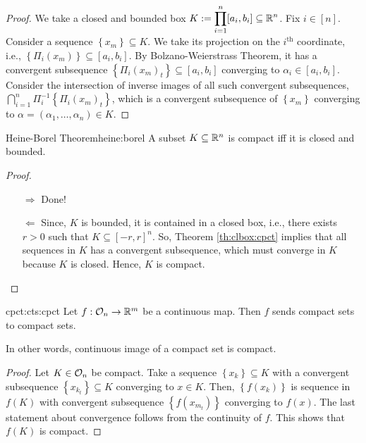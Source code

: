 \documentclass[../Analysis-3.tex]{subfiles}
\begin{document}
\begin{proof}
  We take a closed and bounded box $ \displaystyle K := \prod_{i=1}^{n} [a_i, b_i] \subseteq \mathbb{R}^n $. Fix $ i \in [n] $. Consider a sequence $ \left\{ x_m \right\} \subseteq K $. We take its projection on the $ i^{\text{th}} $ coordinate, i.e., $ \left\{ \Pi_i(x_m) \right\} \subseteq [a_i, b_i] $. By Bolzano-Weierstrass Theorem, it has a convergent subsequence $ \left\{ \Pi_i(x_m)_t \right\} \subseteq [a_i, b_i] $ converging to $ \alpha_i \in [a_i, b_i] $. Consider the intersection of inverse images of all such convergent subsequences, $ \displaystyle \bigcap_{i=1}^n \Pi_i^{-1}\left\{ \Pi_i(x_m)_t \right\} $, which is a convergent subsequence of $ \left\{ x_m \right\} $ converging to $ \alpha = (\alpha_1, \ldots, \alpha_n) \in K $.
\end{proof}



\begin{Thm}{Heine-Borel Theorem}{heine:borel}
  A subset $ K \subseteq \mathbb{R}^n $ is compact iff it is closed and bounded.
\end{Thm}

\begin{proof}
  \begin{itemize}
    \item[$ \Longrightarrow $] Done!
    \item[$ \Longleftarrow $] Since, $ K $ is bounded, it is contained in a closed box, i.e., there exists $ r > 0 $ such that $ K \subseteq [-r, r]^n $. So, Theorem \ref{th:clbox:cpct} implies that all sequences in $ K $ has a convergent subsequence, which must converge in $ K $ because $ K $ is closed. Hence, $ K $ is compact.
  \end{itemize}
\end{proof}



\begin{Thm}{}{cpct:cts:cpct}
  Let $ f:\mathcal{O}_{n} \to \mathbb{R}^m $ be a continuous map. Then $ f $ sends compact sets to compact sets.
\end{Thm}

In other words, continuous image of a compact set is compact.

\begin{proof}
  Let $ K \in \mathcal{O}_{n} $ be compact. Take a sequence $ \left\{ x_k \right\} \subseteq K $ with a convergent subsequence $ \left\{ x_{k_t} \right\} \subseteq K $ converging to $ x \in K $. Then, $ \left\{ f(x_k) \right\} $ is sequence in $ f(K) $  with convergent subsequence $ \left\{ f(x_{m_t}) \right\} $  converging to $ f(x) $. The last statement about convergence follows from the continuity of $ f $. This shows that $ f(K) $ is compact.
\end{proof}
\end{document}
